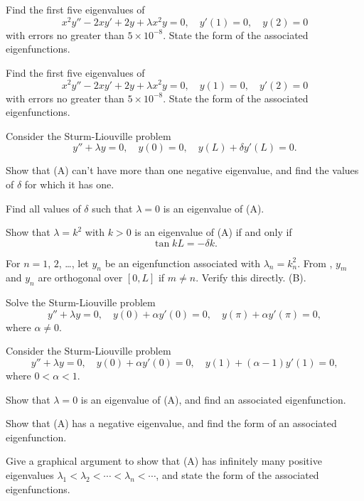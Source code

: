 \begin{exerciselist}
\item\label{exer:13.2.23}\Cex
Find the first five eigenvalues of
\[
x^{2}y''-2xy'+2y+\lambda x^{2}y=0, \quad y'(1)=0,\quad y(2)=0
\]
with errors no greater than $5\times 10^{-8}$. State the form of the
associated eigenfunctions.

\item\label{exer:13.2.24}\Cex
Find the first five eigenvalues of
\[
x^{2}y''-2xy'+2y+\lambda x^{2}y=0, \quad y(1)=0,\quad y'(2)=0
\]
with errors no greater than $5\times 10^{-8}$. State the form of the
associated eigenfunctions.

\item\label{exer:13.2.25}Consider the Sturm-Liouville problem
\[\tag{A}
y''+\lambda y=0,\quad y(0)=0,\quad y(L)+\delta y'(L)=0.
\]

\begin{alist}
\item Show that (A)  can't have more than one negative eigenvalue,
and find the values of $\delta$ for which it has one.
\item Find all values of $\delta$ such that $\lambda=0$ is an eigenvalue
of (A).
\item Show that $\lambda=k^{2}$ with $k>0$ is an eigenvalue of (A)
if and only if
\[\tag{B}
\tan kL=-\delta k.
\]
\item
For
 $n=1$, $2$, \dots, let $y_{n}$  be an eigenfunction  associated with
$\lambda_{n}=k_{n}^{2}$. From , $y_{m}$  and
$y_{n}$ are orthogonal over $[0,L]$ if $m\ne n$. Verify this  directly.
 (B).
\end{alist}

\item\label{exer:13.2.26}Solve the Sturm-Liouville problem
\[
y''+\lambda y=0,\quad y(0)+\alpha y'(0)=0,\quad y(\pi)+\alpha y'(\pi)=0,
\]
where $\alpha\ne0$.



\item\label{exer:13.2.27}\Lex
Consider the Sturm-Liouville problem
\[\tag{A}
y''+\lambda y=0,\quad y(0)+\alpha y'(0)=0,\quad y(1)+(\alpha-1) y'(1)=0,
\]
where $0<\alpha<1$.
\begin{alist}
\item Show that $\lambda=0$  is an eigenvalue of   (A),
and find an associated eigenfunction.
\item Show that  (A)   has a negative eigenvalue,
and find the form of an associated eigenfunction.
\item Give a graphical argument to show that (A) has infinitely many
positive eigenvalues $\lambda_{1} < \lambda_{2}<\cdots
<\lambda_{n}<\cdots$, and state the form of the associated eigenfunctions.
\end{alist}


\end{exerciselist}
